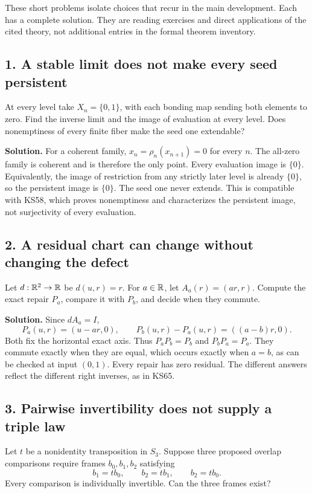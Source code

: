 \clearpage
{}\label{app:workshop}
These short problems isolate choices that recur in the main development. Each has a complete solution. They are reading exercises and direct applications of the cited theory, not additional entries in the formal theorem inventory.

\subsection*{1. A stable limit does not make every seed persistent}
At every level take \(X_n=\{0,1\}\), with each bonding map sending both elements to zero. Find the inverse limit and the image of evaluation at every level. Does nonemptiness of every finite fiber make the seed one extendable?

\textbf{Solution.} For a coherent family, \(x_n=\rho_n(x_{n+1})=0\) for every \(n\). The all-zero family is coherent and is therefore the only point. Every evaluation image is \(\{0\}\). Equivalently, the image of restriction from any strictly later level is already \(\{0\}\), so the persistent image is \(\{0\}\). The seed one never extends. This is compatible with KS58, which proves nonemptiness and characterizes the persistent image, not surjectivity of every evaluation.

\subsection*{2. A residual chart can change without changing the defect}
Let \(d:\mathbb R^2\to\mathbb R\) be \(d(u,r)=r\). For \(a\in\mathbb R\), let \(A_a(r)=(ar,r)\). Compute the exact repair \(P_a\), compare it with \(P_b\), and decide when they commute.

\textbf{Solution.} Since \(dA_a=I\),
\[
 P_a(u,r)=(u-ar,0),\qquad
 P_b(u,r)-P_a(u,r)=((a-b)r,0).
\]
Both fix the horizontal exact axis. Thus \(P_aP_b=P_b\) and \(P_bP_a=P_a\). They commute exactly when they are equal, which occurs exactly when \(a=b\), as can be checked at input \((0,1)\). Every repair has zero residual. The different answers reflect the different right inverses, as in KS65.

\subsection*{3. Pairwise invertibility does not supply a triple law}
Let \(t\) be a nonidentity transposition in \(S_3\). Suppose three proposed overlap comparisons require frames \(b_0,b_1,b_2\) satisfying
\[
 b_1=tb_0,\qquad b_2=tb_1,\qquad b_2=tb_0.
\]
Every comparison is individually invertible. Can the three frames exist?

